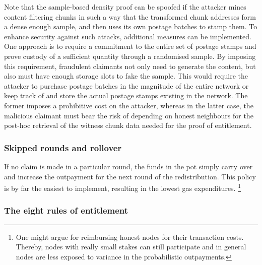 Note that the sample-based density proof can be spoofed if the attacker mines content filtering chunks in such a way that the transformed chunk addresses form a dense enough sample, and then uses its own postage batches to stamp them. 
To enhance security against such attacks, additional measures can be implemented. One approach is to require a commitment to the entire set of postage stamps and prove custody of a sufficient quantity through a randomised sample. By imposing this requirement, fraudulent claimants not only need to generate the content, but also must have enough storage slots to fake the sample. This would require the attacker to purchase postage batches in the magnitude of the entire network 
or keep track of and store the actual postage stamps existing in the network. The former imposes a prohibitive cost on the attacker, whereas in the latter case, the malicious claimant must bear the risk of depending on honest neighbours for the post-hoc retrieval of the witness chunk data needed for the proof of entitlement.



\subsubsection{Skipped rounds and rollover}

If no claim is made in a particular round, the funds in the pot simply carry over and increase the outpayment for the next round of the redistribution. This policy is by far the easiest to implement, resulting in the lowest gas expenditures.%
%
\footnote{One might argue for reimbursing honest nodes for their transaction costs. Thereby,  nodes with really small stakes can still participate and in general nodes are less exposed to variance in the probabilistic outpayments.}

\subsubsection{The eight rules of entitlement}

